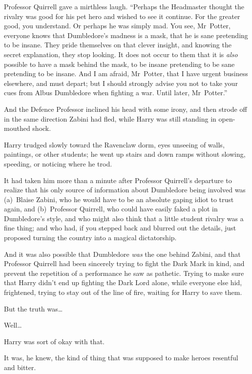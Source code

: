 Professor Quirrell gave a mirthless laugh. “Perhaps the Headmaster thought the rivalry was good for his pet hero and wished to see it continue. For the greater good, you understand. Or perhaps he was simply mad. You see, Mr~Potter, everyone knows that Dumbledore’s madness is a mask, that he is sane pretending to be insane. They pride themselves on that clever insight, and knowing the secret explanation, they stop looking. It does not occur to them that it is \emph{also} possible to have a mask behind the mask, to be insane pretending to be sane pretending to be insane. And I am afraid, Mr~Potter, that I have urgent business elsewhere, and must depart; but I should strongly advise you not to take your cues from Albus Dumbledore when fighting a war. Until later, Mr~Potter.”

And the Defence Professor inclined his head with some irony, and then strode off in the same direction Zabini had fled, while Harry was still standing in open-mouthed shock.


Harry trudged slowly toward the Ravenclaw dorm, eyes unseeing of walls, paintings, or other students; he went up stairs and down ramps without slowing, speeding, or noticing where he trod.

It had taken him more than a minute after Professor Quirrell’s departure to realize that his only source of information about Dumbledore being involved was (a)~Blaise Zabini, who he would have to be an absolute gaping idiot to trust again, and (b)~Professor Quirrell, who could have easily faked a plot in Dumbledore’s style, and who might also think that a little student rivalry was a fine thing; and who had, if you stepped back and blurred out the details, just proposed turning the country into a magical dictatorship.

And it was also possible that Dumbledore \emph{was} the one behind Zabini, and that Professor Quirrell had been sincerely trying to fight the Dark Mark in kind, and prevent the repetition of a performance he saw as pathetic. Trying to make sure that Harry didn’t end up fighting the Dark Lord alone, while everyone else hid, frightened, trying to stay out of the line of fire, waiting for Harry to save them.

But the truth was…

Well…

Harry was sort of okay with that.

It was, he knew, the kind of thing that was supposed to make heroes resentful and bitter.

